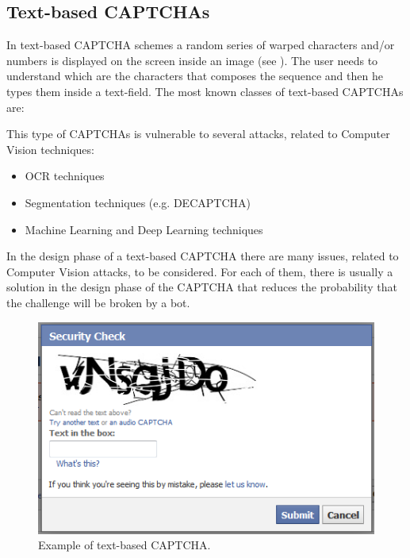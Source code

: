 \subsection{Text-based CAPTCHAs}
In text-based CAPTCHA schemes a random series of warped characters and/or numbers is displayed on the screen inside an image (see ). The user needs to understand which are the characters that composes the sequence and then he types them inside a text-field. The most known classes of text-based CAPTCHAs are:
\begin{itemize}
\end{itemize}
This type of CAPTCHAs is vulnerable to several attacks, related to Computer Vision techniques:
\begin{itemize}
\item{OCR techniques\cite{OCR}}
\item{Segmentation techniques (e.g. DECAPTCHA\cite{DECAPTCHA})}
\item{Machine Learning and Deep Learning techniques}
\end{itemize}
In the design phase of a text-based CAPTCHA there are many issues, related to Computer Vision attacks, to be considered. For each of them, there is usually a solution in the design phase of the CAPTCHA that reduces the probability that the challenge will be broken by a bot\cite{DECAPTCHA}.
\begin{figure}[h]
     \centering
     \includegraphics[width=.55\linewidth]{Images/StateOfArt/text_CAPTCHA}
     \caption{\footnotesize{Example of text-based CAPTCHA.}}\label{soa:text_CAPTCHA}
\end{figure}

